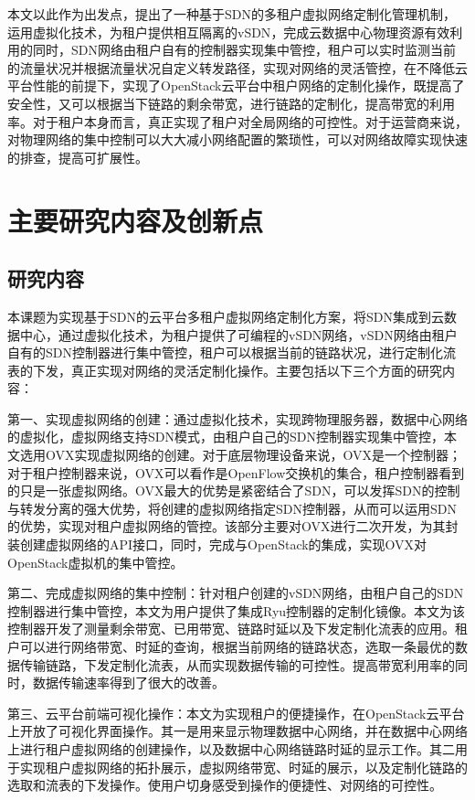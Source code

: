 本文以此作为出发点，提出了一种基于SDN的多租户虚拟网络定制化管理机制，运用虚拟化技术，为租户提供相互隔离的\gls*{vSDN}，完成云数据中心物理资源有效利用的同时，SDN网络由租户自有的控制器实现集中管控，租户可以实时监测当前的流量状况并根据流量状况自定义转发路径，实现对网络的灵活管控，在不降低云平台性能的前提下，实现了OpenStack云平台中租户网络的定制化操作，既提高了安全性，又可以根据当下链路的剩余带宽，进行链路的定制化，提高带宽的利用率。对于租户本身而言，真正实现了租户对全局网络的可控性。对于运营商来说，对物理网络的集中控制可以大大减小网络配置的繁琐性，可以对网络故障实现快速的排查，提高可扩展性。

\section{主要研究内容及创新点}
\subsection{研究内容}
本课题为实现基于SDN的云平台多租户虚拟网络定制化方案，将SDN集成到云数据中心，通过虚拟化技术，为租户提供了可编程的vSDN网络，vSDN网络由租户自有的SDN控制器进行集中管控，租户可以根据当前的链路状况，进行定制化流表的下发，真正实现对网络的灵活定制化操作。主要包括以下三个方面的研究内容：

第一、实现虚拟网络的创建：通过虚拟化技术，实现跨物理服务器，数据中心网络的虚拟化，虚拟网络支持SDN模式，由租户自己的SDN控制器实现集中管控，本文选用\gls*{OVX}\cite{OVX-1}实现虚拟网络的创建。对于底层物理设备来说，OVX是一个控制器；对于租户控制器来说，OVX可以看作是OpenFlow交换机的集合，租户控制器看到的只是一张虚拟网络。OVX最大的优势是紧密结合了SDN，可以发挥SDN的控制与转发分离的强大优势，将创建的虚拟网络指定SDN控制器，从而可以运用SDN的优势，实现对租户虚拟网络的管控。该部分主要对OVX进行二次开发，为其封装创建虚拟网络的API接口，同时，完成与OpenStack的集成，实现OVX对OpenStack虚拟机的集中管控。

第二、完成虚拟网络的集中控制：针对租户创建的vSDN网络，由租户自己的SDN控制器进行集中管控，本文为用户提供了集成Ryu\cite{Ryu-1}控制器的定制化镜像。本文为该控制器开发了测量剩余带宽、已用带宽、链路时延以及下发定制化流表的应用。租户可以进行网络带宽、时延的查询，根据当前网络的链路状态，选取一条最优的数据传输链路，下发定制化流表，从而实现数据传输的可控性。提高带宽利用率的同时，数据传输速率得到了很大的改善。

第三、云平台前端可视化操作：本文为实现租户的便捷操作，在OpenStack云平台上开放了可视化界面操作。其一是用来显示物理数据中心网络，并在数据中心网络上进行租户虚拟网络的创建操作，以及数据中心网络链路时延的显示工作。其二用于实现租户虚拟网络的拓扑展示，虚拟网络带宽、时延的展示，以及定制化链路的选取和流表的下发操作。使用户切身感受到操作的便捷性、对网络的可控性。

